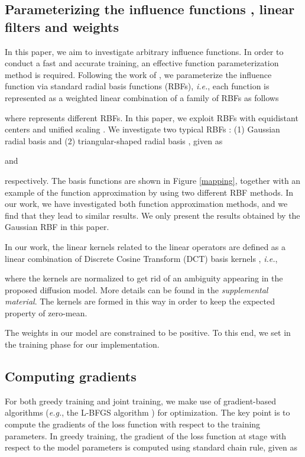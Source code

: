 \documentclass[10pt,journal,compsoc]{IEEEtran}
\newcommand{\eg}{\emph{e.g.}}
\newcommand{\ie}{\emph{i.e.}}
\begin{document}
\begin{comment}
It should be noted that for the models trained in the greedy manner, 
we can stop the inference at any stage, as its output of each stage is optimized. 
However, for the jointly trained models, we have to run  stages, 
as in this case only the output of the  stage is optimized. 
\end{comment}
\subsection{Parameterizing the influence functions 
, linear filters  and weights }
In this paper, we aim to investigate arbitrary influence functions. 
In order to conduct a fast and accurate training, an effective 
function parameterization method is required. {
Following the work of \cite{CSF2014}, }
we parameterize the influence function via standard radial basis 
functions (RBFs), \ie, each function  is represented as a weighted linear combination of a family of RBFs as follows

where  represents different RBFs. 
In this paper, we exploit RBFs with equidistant centers  and unified scaling . 
We investigate two typical RBFs \cite{hu2010handbook}: (1) Gaussian radial basis  and 
(2) triangular-shaped radial basis , given as 

and 

respectively. The basis functions are shown in Figure \ref{mapping}, together with an example of the function approximation 
by using two different RBF methods. 
In our work, we have investigated both function approximation methods, and we find that 
they lead to similar results. 
We only present the results obtained by the Gaussian RBF in this paper. 


In our work, the linear kernels  related to the linear operators  are 
defined as a linear combination of Discrete Cosine Transform (DCT) basis kernels 
, \ie, 

where the kernels  are normalized to get rid of an ambiguity appearing 
in the proposed diffusion model. 
More details can be found in the \textit{supplemental material}. 
The kernels are formed in this way in order to keep the expected property of 
zero-mean. 

{The weights  in our model are constrained to be positive. 
To this end, we set  in the training phase 
for our implementation.} 
\subsection{Computing gradients}
For both greedy training and joint training, we make use of gradient-based algorithms (\eg, 
the L-BFGS algorithm \cite{lbfgs}) for optimization. 
The key point is to compute the gradients of the loss function with respect to the training parameters. 
In greedy training, the gradient of 
the loss function at stage  with respect to the model parameters  is computed using standard chain rule, given as
\end{document}
